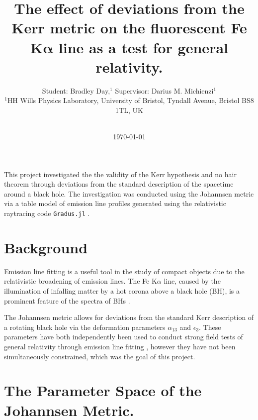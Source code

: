 \documentclass[fleqn,usenatbib]{mnras}
\title[Short title, max. 45 characters]{\vspace{-1em}The effect of deviations from the Kerr metric on the fluorescent Fe K$\bm\alpha$ line as a test for general relativity.}
\author[B.Day \& D. M. Michienzi]{
Student: Bradley Day,$^{1}$
Supervisor: Darius M. Michienzi$^{1}$
\\
$^{1}$HH Wills Physics Laboratory, University of Bristol, Tyndall Avenue, Bristol BS8 1TL, UK\\
\vspace{-1em}
}
\date{\vspace{-2.5em}\\\today\\\vspace{-1.5em}}
\begin{document}
\label{firstpage}
\pagerange{\pageref{firstpage}--\pageref{lastpage}}
\maketitle

\vspace{-5cm}




\noindent
This project investigated the the validity of the Kerr hypothesis and no hair theorem through deviations from the standard description of the spacetime around a black hole. The investigation was conducted using the Johannsen metric \cite{johannsen_regular_2013} via a table model of emission line profiles generated using the relativistic raytracing code \verb|Gradus.jl| \cite{baker_gradusjl_2025}.

\vspace{-2em}
\section{Background}

Emission line fitting is a useful tool in the study of compact objects due to the relativistic broadening of emission lines. The Fe K$\alpha$ line, caused by the illumination of infalling matter by a hot corona above a black hole (BH), is a prominent feature of the spectra of BHs \cite{fabian_broad_2000}. 

The Johannsen metric  allows for deviations from the standard Kerr description of a rotating black hole via the deformation parameters $\alpha_{13}$ and $\epsilon_{3}$. These parameters have both independently been used to conduct strong field tests of general relativity through emission line fitting \cite{bambi_testing_2017, cao_testing_2018, tripathi_constraining_2019, tripathi_testing_2026}, however they have not been simultaneously constrained, which was the goal of this project. 

\vspace{-2.5em}
\section{The Parameter Space of the Johannsen Metric.}
\end{document}
